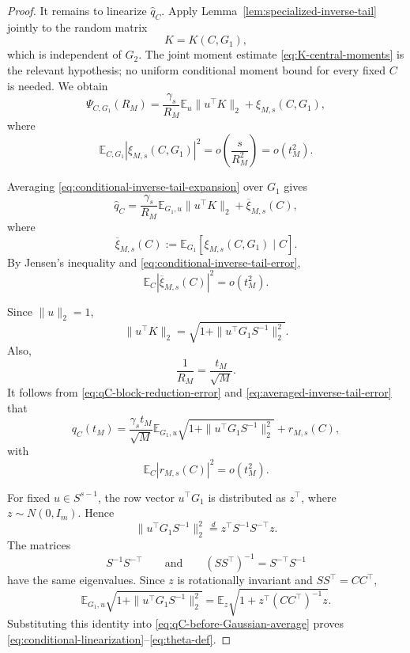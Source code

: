 \documentclass[11pt]{article}
\newcommand{\Ebb}{\mathbb E}
\newcommand{\1}{\mathbf 1}
\begin{document}
\begin{proof}
It remains to linearize \(\widehat q_C\).  Apply
Lemma~\ref{lem:specialized-inverse-tail} jointly to the random matrix
\[
        K=K(C,G_1),
\]
which is independent of \(G_2\).  The joint moment estimate
\eqref{eq:K-central-moments} is the relevant hypothesis; no uniform conditional
moment bound for every fixed \(C\) is needed.  We obtain
\begin{equation}
        \Psi_{C,G_1}(R_M)
        =
        \frac{\gamma_s}{R_M}
        \Ebb_u\|u^\top K\|_2
        +
        \xi_{M,s}(C,G_1),
        \label{eq:conditional-inverse-tail-expansion}
\end{equation}
where
\begin{equation}
        \Ebb_{C,G_1}
        |\xi_{M,s}(C,G_1)|^2
        =
        o\left(\frac{s}{R_M^2}\right)
        =
        o(t_M^2).
        \label{eq:conditional-inverse-tail-error}
\end{equation}

Averaging \eqref{eq:conditional-inverse-tail-expansion} over \(G_1\) gives
\[
        \widehat q_C
        =
        \frac{\gamma_s}{R_M}
        \Ebb_{G_1,u}\|u^\top K\|_2
        +
        \overline\xi_{M,s}(C),
\]
where
\[
        \overline\xi_{M,s}(C)
        :=
        \Ebb_{G_1}[\xi_{M,s}(C,G_1)\mid C].
\]
By Jensen's inequality and \eqref{eq:conditional-inverse-tail-error},
\begin{equation}
        \Ebb_C|\overline\xi_{M,s}(C)|^2
        =
        o(t_M^2).
        \label{eq:averaged-inverse-tail-error}
\end{equation}

Since \(\|u\|_2=1\),
\[
        \|u^\top K\|_2
        =
        \sqrt{1+\|u^\top G_1S^{-1}\|_2^2}.
\]
Also,
\[
        \frac{1}{R_M}
        =
        \frac{t_M}{\sqrt M}.
\]
It follows from \eqref{eq:qC-block-reduction-error} and
\eqref{eq:averaged-inverse-tail-error} that
\begin{equation}
        q_C(t_M)
        =
        \frac{\gamma_s t_M}{\sqrt M}
        \Ebb_{G_1,u}
        \sqrt{1+\|u^\top G_1S^{-1}\|_2^2}
        +
        r_{M,s}(C),
        \label{eq:qC-before-Gaussian-average}
\end{equation}
with
\[
        \Ebb_C|r_{M,s}(C)|^2=o(t_M^2).
\]

For fixed \(u\in S^{s-1}\), the row vector \(u^\top G_1\) is distributed as
\(z^\top\), where \(z\sim N(0,I_m)\).  Hence
\[
        \|u^\top G_1S^{-1}\|_2^2
        \stackrel{d}{=}
        z^\top S^{-1}S^{-\top}z.
\]
The matrices
\[
        S^{-1}S^{-\top}
        \qquad\text{and}\qquad
        (SS^\top)^{-1}=S^{-\top}S^{-1}
\]
have the same eigenvalues.  Since \(z\) is rotationally invariant and
\(SS^\top=CC^\top\),
\[
        \Ebb_{G_1,u}
        \sqrt{1+\|u^\top G_1S^{-1}\|_2^2}
        =
        \Ebb_z
        \sqrt{1+z^\top(CC^\top)^{-1}z}.
\]
Substituting this identity into \eqref{eq:qC-before-Gaussian-average} proves
\eqref{eq:conditional-linearization}--\eqref{eq:theta-def}.
\end{proof}
\end{document}

